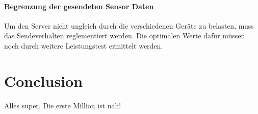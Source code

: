 \documentclass[a4paper]{spie}  %
\begin{document}
\paragraph{Begrenzung der gesendeten Sensor Daten}
Um den Server nicht ungleich durch die verschiedenen Geräte zu belasten, muss das Sendeverhalten reglementiert werden. Die optimalen Werte dafür müssen noch durch weitere Leistungstest ermittelt werden.



\section{Conclusion}
Alles super. Die erste Million ist nah!





\newpage
\appendix
\end{document}

